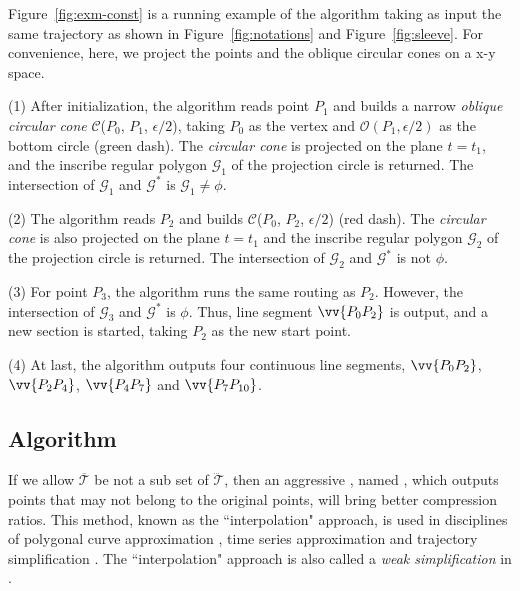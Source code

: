 \begin{example}
\label{exm-alg-conest}
Figure~\ref{fig:exm-const} is a running example of the \cist algorithm taking as input the same trajectory as shown in Figure~\ref{fig:notations} and Figure~\ref{fig:sleeve}.
For convenience, here, we project the points and the oblique circular cones on a x-y space.

\ni (1) After initialization, the \cist algorithm reads point $P_1$ and builds a narrow \emph{oblique circular cone} $\mathcal{C}$($P_0$, $P_{1}$, $\epsilon/2$), taking $P_0$ as the vertex and $\mathcal{O}(P_1, \epsilon/2)$ as the bottom circle (green dash). The \emph{circular cone} is projected on the plane $t=t_1$, and the inscribe regular polygon $\mathcal{G}_1$ of the projection circle is returned. The intersection of $\mathcal{G}_1$ and $\mathcal{G}^*$ is $\mathcal{G}_1 \ne \phi$.

\ni (2) The algorithm reads $P_2$ and builds $\mathcal{C}$($P_0$, $P_{2}$, $\epsilon/2$) (red dash). The \emph{circular cone} is also projected on the plane $t=t_1$ and the inscribe regular polygon $\mathcal{G}_2$ of the projection circle is returned. The intersection of $\mathcal{G}_2$ and $\mathcal{G}^*$ is not $\phi$.

\ni (3) For point $P_3$, the algorithm runs the same routing as $P_2$. However, the intersection of $\mathcal{G}_3$ and $\mathcal{G}^*$ is $\phi$. Thus, line segment $\vv{P_0P_2}$ is output, and a new section is started, taking $P_2$ as the new start point.

\ni (4) At last, the algorithm outputs four continuous line segments, \ie $\vv{P_0P_2}$, $\vv{P_2P_4}$, $\vv{P_4P_{7}}$ and $\vv{P_7P_{10}}$.
\end{example}






\subsection{{Algorithm \cista}}

If we allow $\overline{\mathcal{T}}$ be not a sub set of $\dddot{\mathcal{T}}$, then an aggressive \cist, named \cista, which outputs points that may not belong to the original points, will bring better compression ratios.
This method, known as the ``interpolation" approach, is used in disciplines of polygonal curve approximation \cite{Williams:Bounded, Heckbert:Survey, Zhao:Sleeve}, time series approximation \cite{ORourke:Fitting, Keogh:online, Elmeleegy:Stream, Xie:Stream, Luo:Streaming} and trajectory simplification \cite{Trajcevski:DDR, Lin:Operb}. The ``interpolation" approach is also called a \emph{weak simplification} in \cite{Trajcevski:DDR}.

